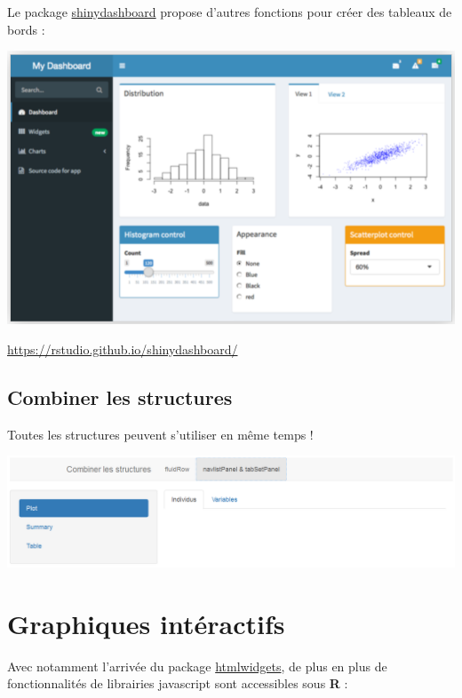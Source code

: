 \documentclass[
]{article}
\begin{document}
Le package
\href{https://rstudio.github.io/shinydashboard/}{shinydashboard} propose
d'autres fonctions pour créer des tableaux de bords :

\includegraphics{img/dash.png}

\url{https://rstudio.github.io/shinydashboard/}

\hypertarget{combiner-les-structures}{%
\subsection{Combiner les structures}\label{combiner-les-structures}}

Toutes les structures peuvent s'utiliser en même temps !

\includegraphics{img/struct.png}

\hypertarget{graphiques-intuxe9ractifs}{%
\section{Graphiques intéractifs}\label{graphiques-intuxe9ractifs}}

Avec notamment l'arrivée du package
\href{http://www.htmlwidgets.org/}{htmlwidgets}, de plus en plus de
fonctionnalités de librairies javascript sont accessibles sous
\textbf{R} :
\end{document}
